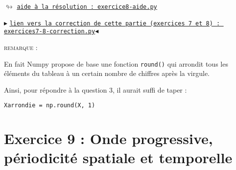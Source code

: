 \documentclass[11pt]{article}
\begin{document}
\begin{center}
 $\looparrowright$ \href{https://github.com/formationPythonPC-Juin/aides-formation/blob/master/exercice8-aide.py}{\underline{\texttt{aide à la résolution : exercice8-aide.py}}}
\end{center}



\bigskip
\begin{center}
$\blacktriangleright$ \href{https://github.com/formationPythonPC-Juin/corrections-formation/blob/master/exercices7-8-correction.py}{\underline{\texttt{lien vers la correction de cette partie (exercices 7 et 8) : exercices7-8-correction.py}}}$\blacktriangleleft$                                                                                                                                                                    \end{center}




\bigskip

\textsc{remarque : }

En fait Numpy propose de base une fonction \texttt{round()} qui arrondit tous les éléments du tableau à un certain nombre de chiffres après la virgule. 

\medskip
Ainsi, pour répondre à la question 3, il aurait suffi de taper : 


\begin{center}
\texttt{Xarrondie = np.round(X, 1)}                                   \end{center}








\newpage



\section{Exercice 9 : Onde progressive, périodicité spatiale et temporelle}



\end{document}
